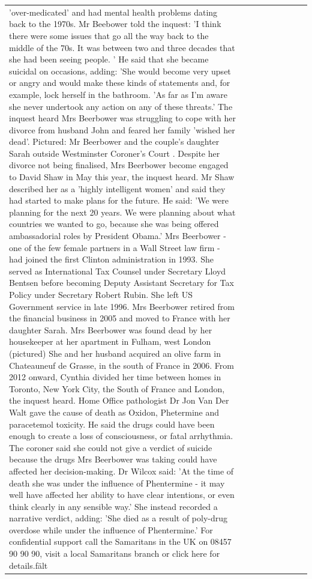 \begin{table}[H]
\begin{tabular}{lllrlllll}
'over-medicated' and had mental health problems dating back to the 1970s. Mr Beebower told the inquest: 'I think there were some issues that go all the way back to the middle of the 70s. It was between two and three decades that she had been seeing people. ' He said that she became suicidal on occasions, adding: 'She would become very upset or angry and would make these kinds of statements and, for example, lock herself in the bathroom. 'As far as I'm aware she never undertook any action on any of these threats.' The inquest heard Mrs Beerbower was struggling to cope with her divorce from husband John and feared her family 'wished her dead'. Pictured: Mr Beerbower and the couple's daughter Sarah outside Westminster Coroner's Court . Despite her divorce not being finalised, Mrs Beerbower become engaged to David Shaw in May this year, the inquest heard. Mr Shaw described her as a 'highly intelligent women' and said they had started to make plans for the future. He said: 'We were planning for the next 20 years. We were planning about what countries we wanted to go, because she was being offered ambassadorial roles by President Obama.' Mrs Beerbower - one of the few female partners in a Wall Street law firm - had joined the first Clinton administration in 1993. She served as International Tax Counsel under Secretary Lloyd Bentsen before becoming Deputy Assistant Secretary for Tax Policy under Secretary Robert Rubin. She left US Government service in late 1996. Mrs Beerbower retired from the financial business in 2005 and moved to France with her daughter Sarah. Mrs Beerbower was found dead by her housekeeper at her apartment in Fulham, west London (pictured) She and her husband acquired an olive farm in Chateauneuf de Grasse, in the south of France in 2006. From 2012 onward, Cynthia divided her time between homes in Toronto, New York City, the South of France and London, the inquest heard. Home Office pathologist Dr Jon Van Der Walt gave the cause of death as Oxidon, Phetermine and paracetemol toxicity. He said the drugs could have been enough to create a loss of consciousness, or fatal arrhythmia. The coroner said she could not give a verdict of suicide because the drugs Mrs Beerbower was taking could have affected her decision-making. Dr Wilcox said: 'At the time of death she was under the influence of Phentermine - it may well have affected her ability to have clear intentions, or even think clearly in any sensible way.' She instead recorded a narrative verdict, adding: 'She died as a result of poly-drug overdose while under the influence of Phentermine.' For confidential support call the Samaritans in the UK on 08457 90 90 90, visit a local Samaritans branch or click here for details.fält \\

\end{tabular}
\end{table}
